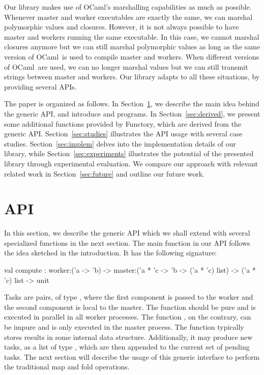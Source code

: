 \documentclass[a4paper,12pt]{article}
\newcommand{\Ocaml}{OCaml}
\newcommand{\functory}{\textsf{Functory}}
\begin{document}
Our library makes use of \Ocaml's marshalling capabilities as much as
possible. Whenever master and worker executables are exactly the same,
we can marshal polymorphic values and closures. However, it is not
always possible to have master and workers running the same
executable. In this case, we cannot marshal closures anymore but we
can still marshal polymorphic values as long as the same version of
\Ocaml\ is used to compile master and workers. When different versions
of \Ocaml\ are used, we can no longer marshal values but we can still
transmit strings between master and workers. Our library adapts to all
these situations, by providing several APIs.

\medskip
The paper is organized as follows. 
In Section~\ref{sec:API}, we
describe the main idea behind the generic API, and introduce
 and  programs. 
In Section~\ref{sec:derived}, we
present some additional functions provided by \functory,
which are derived from the generic
API. 
Section~\ref{sec:studies} illustrates the API usage with several
case studies.
Section~\ref{sec:implem} delves into the implementation details
of our library, while Section~\ref{sec:experiments} illustrates the
potential of the presented library through experimental evaluation. We
compare our approach with relevant related work in
Section~\ref{sec:future} and outline our future work.

\section{API}\label{sec:API}
In this section, we describe the
generic API which we shall extend with several specialized
functions in the next section. The main function in our API follows the idea
sketched in the introduction. It has the following signature:
\begin{ocaml}
  val compute : 
    worker:('a -> 'b) -> 
    master:('a * 'c -> 'b -> ('a * 'c) list) -> 
    ('a * 'c) list -> unit
\end{ocaml}
Tasks are pairs, of type , where the first component is
passed to the worker and the second component is local to the master.
The  function should be pure and is executed in parallel
in all worker processes. The function , on the
contrary, can be impure and is only executed in the master process.
The  function typically stores results 
in some internal data structure.
Additionally, it may produce new tasks, as a list of type 
, which are then appended to the current set of
pending tasks.
The next section will describe the usage of this generic interface to
perform the traditional map and fold operations.
\end{document}
